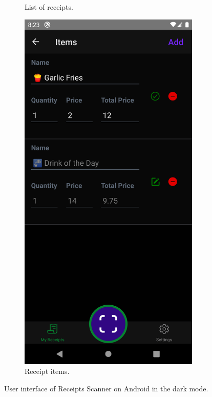 \documentclass[
  digital, %
  table,   %
  oneside, %
  lof,     %
  lot,     %
]{fithesis3}
\newcommand\half{0.45}
\newcommand\subfigsize{0.95}
\begin{document}
\begin{figure}
\begin{subfigure}[t]{\half\textwidth}
      \caption{List of receipts.}
    \end{subfigure}
    \begin{subfigure}[t]{\half\textwidth}
      \centering
      \includegraphics[width=\subfigsize\textwidth]{figures/screens/android/dark/items}
      \caption{Receipt items.}
    \end{subfigure}
    \caption{User interface of Receipts Scanner on Android in the dark mode.}
    \label{fig:dark_mode_android}
\end{figure}
\end{document}

